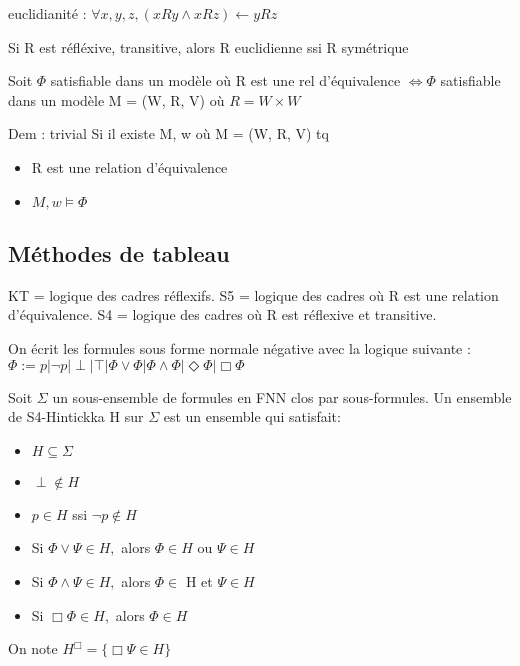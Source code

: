\documentclass[a4paper,10pt]{article}
\begin{document}
euclidianité : $\forall x, y, z, (x R y \wedge xRz) \leftarrow y R z$

\begin{prop}
 Si R est réfléxive, transitive, alors R euclidienne ssi R symétrique
\end{prop}
\begin{prop}
Soit $\Phi$ satisfiable dans un modèle où R est une rel d'équivalence 
$\Leftrightarrow \Phi$ satisfiable dans un modèle M = (W, R, V) où $R = W \times W$
\end{prop}
Dem \fbox{$\Leftarrow$} : trivial
\fbox{$\Rightarrow$} Si il existe M, w où M  = (W, R, V) tq
\begin{itemize}
 \item R est une relation d'équivalence
 \item $M, w \models \Phi$
\end{itemize}





\subsection{Méthodes de tableau}

KT = logique des cadres réflexifs.
S5 = logique des cadres où R est une relation d'équivalence.
S4 = logique des cadres où R est réflexive et transitive.

On écrit les formules sous forme normale négative avec la logique suivante :\\
 $ \Phi := p | \lnot p | \perp | \top | \Phi \vee \Phi | \Phi \wedge \Phi | \Diamond \Phi | \Box \Phi $

\begin{definition}
 Soit $\Sigma$ un sous-ensemble de formules en FNN clos par sous-formules. Un ensemble de S4-Hintickka H sur $\Sigma$ est un ensemble qui satisfait:
\begin{itemize}
 \item $H \subseteq \Sigma$
 \item $\perp \not \in H$
 \item $p \in H$ ssi $\lnot p \not \in H$
 \item Si $\Phi\vee\Psi \in H,$ alors $\Phi \in H$ ou $\Psi \in H$
  \item Si $\Phi\wedge\Psi \in H,$ alors $\Phi \in$ H et $\Psi \in H$
  \item Si $\Box \Phi \in H,$ alors $\Phi \in H$
\end{itemize}
On note $H^{\Box} = \{\Box \Psi \in H \}$
\end{definition}
\end{document}
